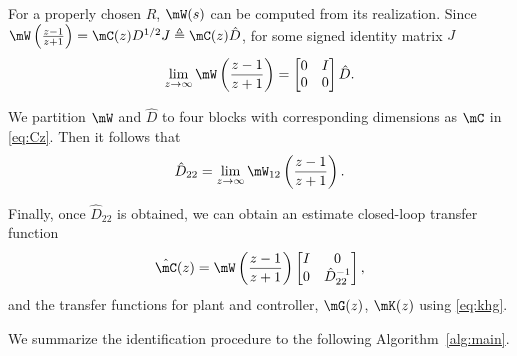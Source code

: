   For a properly chosen $R$, $\mW(s)$ can be computed from its realization. Since $\mW\left(\frac{z-1}{z+1}\right)=\mC(z)D^{1/2}J\triangleq \mC(z)\hat{D}$, for some signed identity matrix $J$ \cite{hayden}
  \begin{equation}
    \lim_{z\rightarrow\infty}\mW\left(\frac{z-1}{z+1}\right)=\begin{bmatrix} 0 & I \\
      0 & 0 
    \end{bmatrix} \hat{D}.
  \end{equation}

  We partition $\mW$ and $\hat{D}$ to four blocks with corresponding dimensions as $\mC$ in \eqref{eq:Cz}. Then it follows that 
  \begin{equation}\label{eq:D22}
    \hat{D}_{22}=\lim_{z\rightarrow\infty}\mW_{12}\left(\frac{z-1}{z+1}\right).
  \end{equation}

  Finally, once $\hat{D}_{22}$ is obtained, we can obtain an estimate closed-loop transfer function 
  \begin{equation}\label{eq:estC}
    \hat{\mC}(z)=\mW\left(\frac{z-1}{z+1}\right)\begin{bmatrix} I & 0 \\ 0 & \hat{D}^{-1}_{22}
    \end{bmatrix},
  \end{equation}
  and the transfer functions for plant and controller, $\mG(z)$, $\mK(z)$ using \eqref{eq:khg}.

  We summarize the identification procedure to the following Algorithm~\ref{alg:main}. 


